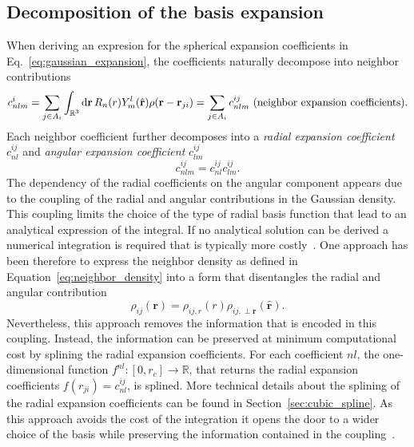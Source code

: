 \subsection{Decomposition of the basis expansion}
When deriving an expresion for the spherical expansion coefficients in Eq.~\eqref{eq:gaussian_expansion}, the coefficients naturally decompose into neighbor contributions
\begin{equation}
  \label{eq:neighbor_contr}
  c^i_{nlm} = \sum_{j\in A_i}\int_{\mathbb{R}^3}\mathrm{d}\mathbf{r}\, R_n(r)Y_m^l(\hat{\mathbf{r}})\rho(\mathbf{r}-\mathbf{r}_{ji}) = \sum_{j\in A_i}c^{ij}_{nlm} \textrm{ (neighbor expansion coefficients)}.\\
\end{equation}
Each neighbor coefficient further decomposes into a \emph{radial expansion coefficient} $c_{nl}^{ij}$ and \emph{angular expansion coefficient} $c_{lm}^{ij}$
\begin{equation}
  \label{eq:radial_expansion}
  c^{ij}_{nlm} = c_{nl}^{ij}c^{ij}_{lm}.
\end{equation}
The dependency of the radial coefficients on the angular component appears due to the coupling of the radial and angular contributions in the Gaussian density.
This coupling limits the choice of the type of radial basis function that lead to an analytical expression of the integral.
If no analytical solution can be derived a numerical integration is required that is typically more costly~\cite{musil2021efficient}.
One approach has been therefore to express the neighbor density as defined in Equation~\ref{eq:neighbor_density} into a form that disentangles the radial and angular contribution~\cite{caro2019optimizing}
\begin{equation}
  \rho_{ij}(\mathbf{r}) = \rho_{ij,r}(r)\rho_{ij,\perp \mathbf{r}}(\hat{\mathbf{r}}).
\end{equation}
Nevertheless, this approach removes the information that is encoded in this coupling.
Instead, the information can be preserved at minimum computational cost by splining the radial expansion coefficients.
For each coefficient $nl$, the one-dimensional function $f^{nl}:[0,r_c]\rightarrow\mathbb{R}$, that returns the radial expansion coefficients $f(r_{ji}) = c_{nl}^{ij}$, is splined.
More technical details about the splining of the radial expansion coefficients can be found in Section~\ref{sec:cubic_spline}.
As this approach avoids the cost of the integration it opens the door to a wider choice of the basis while preserving the information contained in the coupling~\cite{goscinski2021optimal,bigi2022smooth,lopanitsyna2023modeling}. 

